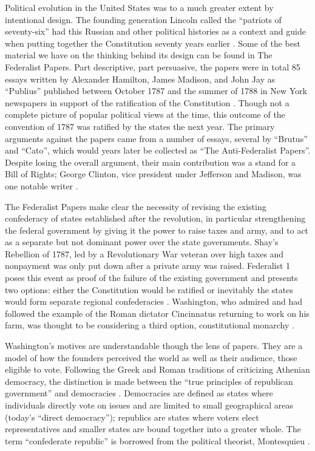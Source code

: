 Political evolution in the United States was to a much greater extent by intentional design.
The founding generation Lincoln called the ``patriots of seventy-six'' had this Russian and other political histories as a context and guide when putting together the Constitution seventy years earlier \cite[vol. 1, p. 112]{lincoln2008}.
Some of the best material we have on the thinking behind its design can be found in The Federalist Papers.
Part descriptive, part persuasive, the papers were in total 85 essays written by Alexander Hamilton, James Madison, and John Jay as ``Publius'' published between October 1787 and the summer of 1788 in New York newspapers in support of the ratification of the Constitution \cite[p. 2]{mosteller2012}.
Though not a complete picture of popular political views at the time, this outcome of the convention of 1787 was ratified by the states the next year.
The primary arguments against the papers came from a number of essays, several by ``Brutus'' and ``Cato'', which would years later be collected as ``The Anti-Federalist Papers''.
Despite losing the overall argument, their main contribution was a stand for a Bill of Rights; George Clinton, vice president under Jefferson and Madison, was one notable writer \cite{borden1965}.

The Federalist Papers make clear the necessity of revising the existing confederacy of states established after the revolution, in particular strengthening the federal government by giving it the power to raise taxes and army, and to act as a separate but not dominant power over the state governments.
Shay's Rebellion of 1787, led by a Revolutionary War veteran over high taxes and nonpayment was only put down after a private army was raised.
Federalist 1 poses this event as proof of the failure of the existing government and presents two options: either the Constitution would be ratified or inevitably the states would form separate regional confederacies \cite[n. 1]{fed}.
Washington, who admired and had followed the example of the Roman dictator Cincinnatus returning to work on his farm, was thought to be considering a third option, constitutional monarchy \cite[ch. 3]{feldman2017}.

Washington's motives are understandable though the lens of papers.
They are a model of how the founders perceived the world as well as their audience, those eligible to vote.
Following the Greek and Roman traditions of criticizing Athenian democracy, the distinction is made between the ``true principles of republican government'' and democracies \cite[n. 1]{fed}.
Democracies are defined as states where individuals directly vote on issues and are limited to small geographical areas (today's ``direct democracy'');
republics are states where voters elect representatives and smaller states are bound together into a greater whole.
The term ``confederate republic'' is borrowed from the political theorist, Montesquieu \cite[n. 9]{fed}.

